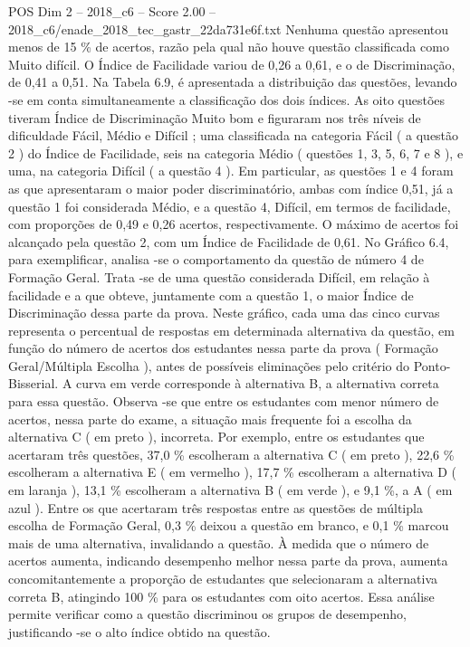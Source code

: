 \begin{textsample}{POS Dim 2 – 2018\_c6 – Score 2.00 – 2018\_c6/enade\_2018\_tec\_gastr\_22da731e6f.txt}
Nenhuma questão apresentou menos de 15 \% de acertos, razão pela qual não houve questão classificada como Muito difícil.
O Índice de Facilidade variou de 0,26 a 0,61, e o de Discriminação, de 0,41 a 0,51.
Na Tabela 6.9, é apresentada a distribuição das questões, levando -se em conta simultaneamente a classificação dos dois índices.
As oito questões tiveram Índice de Discriminação Muito bom e figuraram nos três níveis de dificuldade Fácil, Médio e Difícil ; uma classificada na categoria Fácil ( a questão 2 ) do Índice de Facilidade, seis na categoria Médio ( questões 1, 3, 5, 6, 7 e 8 ), e uma, na categoria Difícil ( a questão 4 ).
Em particular, as questões 1 e 4 foram as que apresentaram o maior poder discriminatório, ambas com índice 0,51, já a questão 1 foi considerada Médio, e a questão 4, Difícil, em termos de facilidade, com proporções de 0,49 e 0,26 acertos, respectivamente.
O máximo de acertos foi alcançado pela questão 2, com um Índice de Facilidade de 0,61.
No Gráfico 6.4, para exemplificar, analisa -se o comportamento da questão de número 4 de Formação Geral.
Trata -se de uma questão considerada Difícil, em relação à facilidade e a que obteve, juntamente com a questão 1, o maior Índice de Discriminação dessa parte da prova.
Neste gráfico, cada uma das cinco curvas representa o percentual de respostas em determinada alternativa da questão, em função do número de acertos dos estudantes nessa parte da prova ( Formação Geral/Múltipla Escolha ), antes de possíveis eliminações pelo critério do Ponto-Bisserial.
A curva em verde corresponde à alternativa B, a alternativa correta para essa questão.
Observa -se que entre os estudantes com menor número de acertos, nessa parte do exame, a situação mais frequente foi a escolha da alternativa C ( em preto ), incorreta.
Por exemplo, entre os estudantes que acertaram três questões, 37,0 \% escolheram a alternativa C ( em preto ), 22,6 \% escolheram a alternativa E ( em vermelho ), 17,7 \% escolheram a alternativa D ( em laranja ), 13,1 \% escolheram a alternativa B ( em verde ), e 9,1 \%, a A ( em azul ).
Entre os que acertaram três respostas entre as questões de múltipla escolha de Formação Geral, 0,3 \% deixou a questão em branco, e 0,1 \% marcou mais de uma alternativa, invalidando a questão.
À medida que o número de acertos aumenta, indicando desempenho melhor nessa parte da prova, aumenta concomitantemente a proporção de estudantes que selecionaram a alternativa correta B, atingindo 100 \% para os estudantes com oito acertos.
Essa análise permite verificar como a questão discriminou os grupos de desempenho, justificando -se o alto índice obtido na questão.

\end{textsample}
